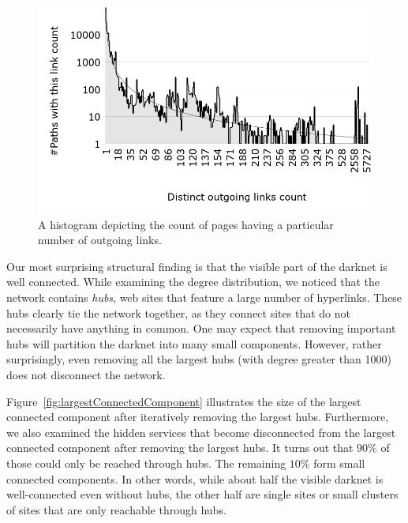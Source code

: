 \documentclass[USenglish,oneside,twocolumn]{article}
\begin{document}
\begin{figure}
    \centering
    \includegraphics[width=\linewidth]{images/DistinctOutgoingLinksCount.png}
    \caption{A histogram depicting the count of pages having a particular
             number of outgoing links.}
    \label{fig:outgoingPowerLaw}
\end{figure}

Our most surprising structural finding is that the visible part of the darknet is well connected. 
While examining the degree distribution, we noticed that the network contains \emph{hubs}, web sites that feature a large number of hyperlinks.  These hubs clearly tie the network together, as they connect sites that do not necessarily have anything in common.
One may expect that removing important hubs will partition the darknet into many small components. However, rather surprisingly, even removing all the largest hubs (with degree greater than 1000) does not disconnect the network.

Figure~\ref{fig:largestConnectedComponent} illustrates the size of the largest connected component after iteratively removing the largest hubs.
Furthermore, we also examined the hidden services that become disconnected from the largest connected component after removing the largest hubs. It turns out that $90\%$ of those could only be reached through hubs. The remaining $10\%$ form small connected components. In other words, while about half the visible darknet is well-connected even without hubs, the other half are single sites or small clusters of sites that are only reachable through hubs. 
\end{document}
